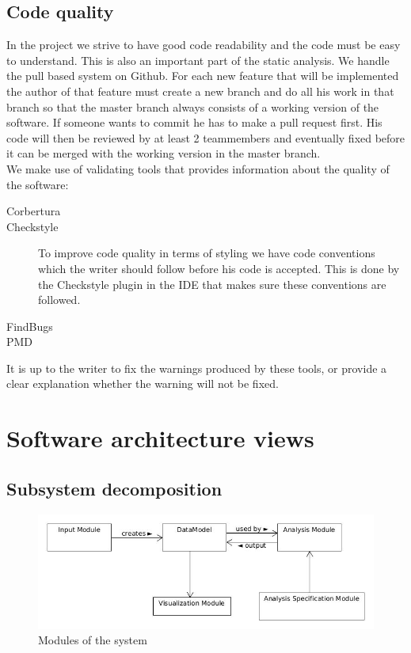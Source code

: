 \documentclass[a4paper]{article}
\begin{document}
\subsection{Code quality}
In the project we strive to have good code readability and the code must be easy to understand. This is also an important part of the static analysis. We handle the pull based system on Github. For each new feature that will be implemented the author of that feature must create a new branch and do all his work in that branch so that the master branch always consists of a working version of the software. If someone wants to commit he has to make a pull request first. His code will then be reviewed by at least 2 teammembers and eventually fixed before it can be merged with the working version in the master branch.\\
We make use of validating tools that provides information about the quality of the software:
\begin{description}
\item[Corbertura] 
\item[Checkstyle] To improve code quality in terms of styling we have code conventions which the writer should follow before his code is accepted. This is done by the Checkstyle plugin in the IDE that makes sure these conventions are followed.
\item[FindBugs] 
\item[PMD] 
\end{description}

It is up to the writer to fix the warnings produced by these tools, or provide a clear explanation whether the warning will not be fixed.


\section{Software architecture views}
\subsection{Subsystem decomposition}

\begin{figure}[h]
	\centering
    	\includegraphics[scale=0.5]{images/modules.jpg}
    \caption{Modules of the system}
	\label{fig:modules}
\end{figure}
\end{document}
